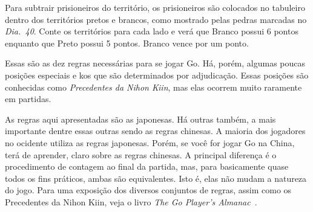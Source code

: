 Para subtrair prisioneiros do território, os prisioneiros são colocados no tabuleiro dentro dos territórios pretos e brancos, como mostrado pelas pedras marcadas no \emph{Dia.\@~40}. Conte os territórios para cada lado e verá que Branco possui 6 pontos enquanto que Preto possui 5 pontos. Branco vence por um ponto.

\bigskip

Essas são as dez regras necessárias para se jogar Go. Há, porém, algumas poucas posições especiais e kos que são determinados por adjudicação. Essas posições são conhecidas como \emph{Precedentes da Nihon Kiin}, mas elas ocorrem muito raramente em partidas.

As regras aqui apresentadas são as japonesas. Há outras também, a mais importante dentre essas outras sendo as regras chinesas. A maioria dos jogadores no ocidente utiliza as regras japonesas. Porém, se você for jogar Go na China, terá de aprender, claro sobre as regras chinesas. A principal diferença é o procedimento de contagem ao final da partida, mas, para basicamente quase todos os fins práticos, ambas são equivalentes. Isto é, elas não mudam a natureza do jogo. Para uma exposição dos diversos conjuntos de regras, assim como os Precedentes da Nihon Kiin, veja o livro \emph{The Go Player's Almanac}~\cite{bozulich_almanac}.